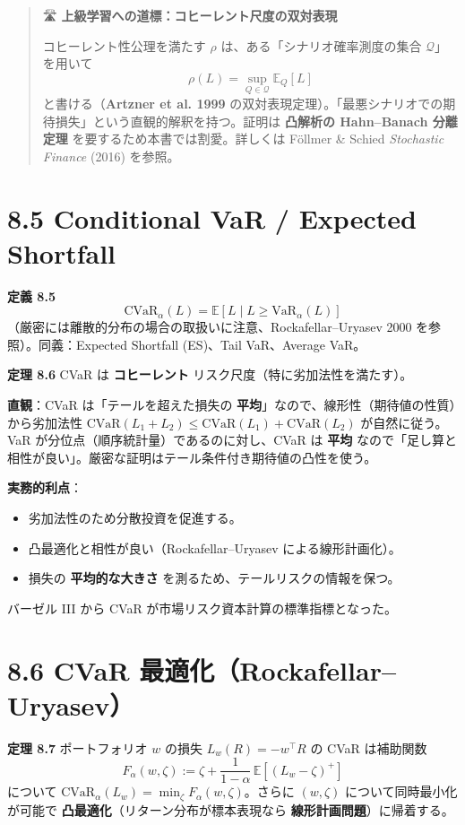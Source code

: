 \documentclass[11pt,a4paper]{report}
\begin{document}
\begin{quote}
🛣 \textbf{上級学習への道標：コヒーレント尺度の双対表現}

コヒーレント性公理を満たす $\rho$ は、ある「シナリオ確率測度の集合 $\mathcal{Q}$」を用いて
\[ \rho(L) = \sup_{Q \in \mathcal{Q}} \mathbb{E}_Q[L] \]
と書ける（\textbf{Artzner et al. 1999} の双対表現定理）。「最悪シナリオでの期待損失」という直観的解釈を持つ。証明は \textbf{凸解析の Hahn–Banach 分離定理} を要するため本書では割愛。詳しくは Föllmer \& Schied \emph{Stochastic Finance} (2016) を参照。
\end{quote}

\section{8.5 Conditional VaR / Expected Shortfall}

\textbf{定義 8.5} \[ \mathrm{CVaR}_\alpha(L) = \mathbb{E}[L \mid L \ge \mathrm{VaR}_\alpha(L)] \] （厳密には離散的分布の場合の取扱いに注意、Rockafellar–Uryasev 2000 を参照）。同義：Expected Shortfall (ES)、Tail VaR、Average VaR。

\textbf{定理 8.6} CVaR は \textbf{コヒーレント} リスク尺度（特に劣加法性を満たす）。

\textbf{直観}：CVaR は「テールを超えた損失の \textbf{平均}」なので、線形性（期待値の性質）から劣加法性 $\mathrm{CVaR}(L_1 + L_2) \le \mathrm{CVaR}(L_1) + \mathrm{CVaR}(L_2)$ が自然に従う。VaR が分位点（順序統計量）であるのに対し、CVaR は \textbf{平均} なので「足し算と相性が良い」。厳密な証明はテール条件付き期待値の凸性を使う。

\textbf{実務的利点}：
\begin{itemize}
\item 劣加法性のため分散投資を促進する。
\item 凸最適化と相性が良い（Rockafellar–Uryasev による線形計画化）。
\item 損失の \textbf{平均的な大きさ} を測るため、テールリスクの情報を保つ。
\end{itemize}

バーゼル III から CVaR が市場リスク資本計算の標準指標となった。

\section{8.6 CVaR 最適化（Rockafellar–Uryasev）}

\textbf{定理 8.7} ポートフォリオ $w$ の損失 $L_w(R) = -w^\top R$ の CVaR は補助関数 \[ F_\alpha(w, \zeta) := \zeta + \frac{1}{1-\alpha}\, \mathbb{E}[(L_w - \zeta)^+] \] について $\mathrm{CVaR}_\alpha(L_w) = \min_\zeta F_\alpha(w, \zeta)$。さらに $(w, \zeta)$ について同時最小化が可能で \textbf{凸最適化}（リターン分布が標本表現なら \textbf{線形計画問題}）に帰着する。
\end{document}
